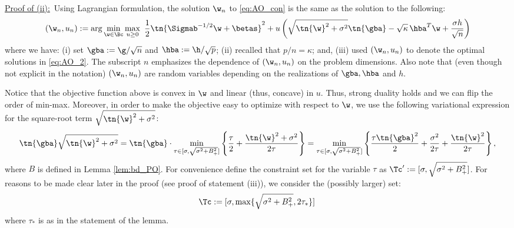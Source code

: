 \vspace{5pt}
\noindent\underline{Proof of (ii):}~Using Lagrangian formulation, the solution $\w_n$ to \eqref{eq:AO_con} is the same as the solution to the following:
\begin{align}
\left(\w_n,u_n\right) :=\arg\min_{\w\in\Bc}\max_{u\geq 0} ~\frac{1}{2}\tn{\Sigmab^{-1/2}\w+\betas}^2 + u \left( \sqrt{\tn{\w}^2+\sigma^2} \tn{\gba} - \sqrt{\kappa}\,{\hba}^T\w + \frac{\sigma h}{\sqrt{n}} \right)\label{eq:AO_2}
\end{align}
where we have: (i) set $\gba := \g/\sqrt{n}$ and $\hba:= \h/\sqrt{p}$; (ii) recalled that $p/n=\kappa$; and, (iii) used $\left(\w_n,u_n\right)$ to denote the optimal solutions in \eqref{eq:AO_2}. The subscript $n$ emphasizes the dependence of $\left(\w_n,u_n\right)$ on the problem dimensions. Also note that (even though not explicit in the notation) $\left(\w_n,u_n\right)$ are random variables depending on the realizations of $\gba,\hba$ and $h$.

 Notice that the objective function above is convex in $\w$ and linear (thus, concave) in $u$. Thus, strong duality holds and we can flip the order of min-max. Moreover, in order to make the objective easy to optimize with respect to $\w$, we use the following variational expression for the square-root term $\sqrt{\tn{\w}^2+\sigma^2}$:
$$
\tn{\gba}\sqrt{\tn{\w}^2+\sigma^2} = \tn{\gba}\cdot\min_{\tau\in[\sigma,\sqrt{\sigma^2+B_+^2}]} \left\{ \frac{\tau}{2} + \frac{\tn{\w}^2+\sigma^2}{2\tau} \right\} = \min_{\tau\in[\sigma,\sqrt{\sigma^2+B_+^2}]} \left\{ \frac{\tau\tn{\gba}^2}{2} + \frac{\sigma^2}{2\tau} + \frac{\tn{\w}^2}{2\tau} \right\},
$$
where $B$ is defined in Lemma \ref{lem:bd_PO}. For convenience define the constraint set for the variable $\tau$ as $\Tc':=[\sigma,\sqrt{\sigma^2+B_+^2}]$. For reasons to be made clear later in the proof (see proof of statement (iii)), we consider the (possibly larger) set:
\[
\Tc:=[\sigma,\max\{\sqrt{\sigma^2+B_+^2},2\tau_*\}]\,
\]
where $\tau_*$ is as in the statement of the lemma.


